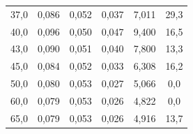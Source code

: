 \documentclass[a4paper, czech]{article}
\begin{document}
\begin{table}[H]
\begin{tabular}{cccccc}
        37,0       & 0,086                                                                       & 0,052                                                                       & 0,037                                                                 & 7,011                                                          & 29,3                                                          \\
        40,0       & 0,096                                                                       & 0,050                                                                       & 0,047                                                                 & 9,400                                                          & 16,5                                                          \\
        43,0       & 0,090                                                                       & 0,051                                                                       & 0,040                                                                 & 7,800                                                          & 13,3                                                          \\
        45,0       & 0,084                                                                       & 0,052                                                                       & 0,033                                                                 & 6,308                                                          & 16,2                                                          \\
        50,0       & 0,080                                                                       & 0,053                                                                       & 0,027                                                                 & 5,066                                                          & 0,0                                                           \\
        60,0       & 0,079                                                                       & 0,053                                                                       & 0,026                                                                 & 4,822                                                          & 0,0                                                           \\
        65,0       & 0,079                                                                       & 0,053                                                                       & 0,026                                                                 & 4,916                                                          & 13,7                                                          \\

\end{tabular}
\end{table}
\end{document}
